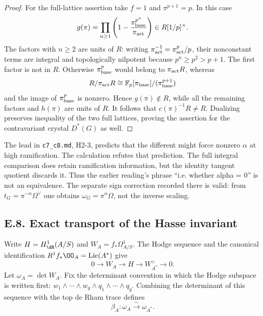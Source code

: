 \begin{proof}
For the full-lattice assertion take $f=1$ and $\pi^{p+1}=p$.  In this case
\[
 g(\pi)=\prod_{n\geq1}
       \left(1-\frac{\pi_{\rm base}^{p^n}}{\pi_{\rm act}}\right)
        \in R[1/p]^\times.
\]
The factors with $n\geq2$ are units of $R$: writing
$\pi_{\rm act}^{-1}=\pi_{\rm act}^{p}/p$, their nonconstant terms are integral and topologically nilpotent because $p^n\geq p^2>p+1$.  The first factor is not in $R$.  Otherwise $\pi_{\rm base}^{p}$ would belong to $\pi_{\rm act}R$, whereas
\[
 R/\pi_{\rm act}R\cong\mathbb F_p[\pi_{\rm base}]/(\pi_{\rm base}^{p+1})
\]
and the image of $\pi_{\rm base}^{p}$ is nonzero.  Hence $g(\pi)\notin R$, while all the remaining factors and $h(\pi)$ are units of $R$.  It follows that $c(\pi)^{-1}R\ne R$.  Dualizing preserves inequality of the two full lattices, proving the assertion for the contravariant crystal $D^*(G)$ as well.
\end{proof}

The lead in \texttt{c7\_c8.md}, H2-3, predicts that the different might force nonzero $\alpha$ at high ramification.  The calculation refutes that prediction.  The full integral comparison does retain ramification information, but the identity tangent quotient discards it.  Thus the earlier reading's phrase ``i.e. whether alpha = 0'' is not an equivalence.  The separate sign correction recorded there is valid: from $t_G=\pi^{-\alpha}\Omega^\vee$ one obtains $\omega_G=\pi^\alpha\Omega$, not the inverse scaling.

\subsection{E.8. Exact transport of the Hasse invariant}

Write $H=H^1_{\dR}(A/S)$ and $W_A=f_*\Omega^1_{A/S}$.  The Hodge sequence and the canonical identification $R^1f_*\OO_A=\operatorname{Lie}(A^*)$ give
\[
 0\longrightarrow W_A\longrightarrow H\longrightarrow W_{A^*}^{\vee}
 \longrightarrow0.
\]
Let $\omega_A=\det W_A$.  Fix the determinant convention in which the Hodge subspace is written first: $w_1\wedge\cdots\wedge w_g\wedge q_1\wedge\cdots\wedge q_g$.  Combining the determinant of this sequence with the top de Rham trace defines
\[
 \beta_A:\omega_A\xrightarrow{\sim}\omega_{A^*}.
\]


